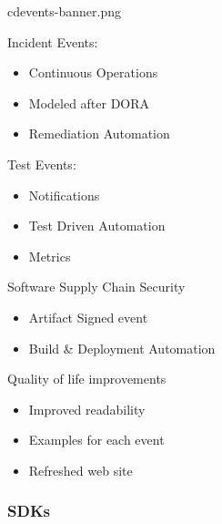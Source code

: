\documentclass[aspectratio=169,11pt,hyperref={colorlinks=true}]{beamer}
\begin{document}
\begin{tpicstripedframe}%
  {cdevents-banner.png}
  {%
  Incident Events:
  \begin{itemize}
    \item Continuous Operations
    \item Modeled after DORA
    \item Remediation Automation
  \end{itemize}
  }%
  {%
  Test Events:
  \begin{itemize}
    \item Notifications
    \item Test Driven Automation
    \item Metrics
  \end{itemize}
  }%
  {%
  Software Supply Chain Security \\
  \vspace{0.01\textheight}
  \begin{itemize}
    \item Artifact Signed event
    \item Build \& Deployment Automation
  \end{itemize}
  }%
  {%
  Quality of life improvements
  \begin{itemize}
    \item Improved readability
    \item Examples for each event
    \item Refreshed web site
  \end{itemize}
  }%
\end{tpicstripedframe}

\begin{blackframe}
  \frametitle{SDKs}
\end{blackframe}
\end{document}
